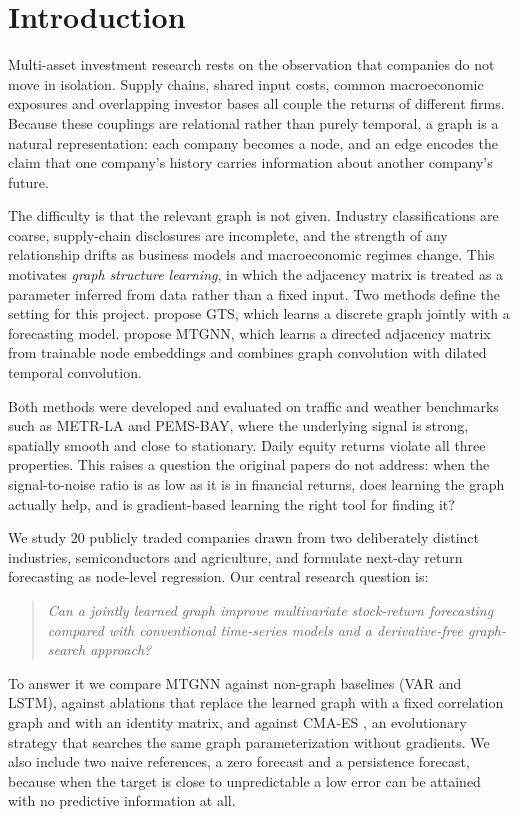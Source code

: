 \section{Introduction}

Multi-asset investment research rests on the observation that companies do not move in isolation. Supply chains, shared input costs, common macroeconomic exposures and overlapping investor bases all couple the returns of different firms. Because these couplings are relational rather than purely temporal, a graph is a natural representation: each company becomes a node, and an edge encodes the claim that one company's history carries information about another company's future.

The difficulty is that the relevant graph is not given. Industry classifications are coarse, supply-chain disclosures are incomplete, and the strength of any relationship drifts as business models and macroeconomic regimes change. This motivates \emph{graph structure learning}, in which the adjacency matrix is treated as a parameter inferred from data rather than a fixed input. Two methods define the setting for this project. \textcite{shang2021gts} propose GTS, which learns a discrete graph jointly with a forecasting model. \textcite{wu2020mtgnn} propose MTGNN, which learns a directed adjacency matrix from trainable node embeddings and combines graph convolution with dilated temporal convolution.

Both methods were developed and evaluated on traffic and weather benchmarks such as METR-LA and PEMS-BAY, where the underlying signal is strong, spatially smooth and close to stationary. Daily equity returns violate all three properties. This raises a question the original papers do not address: when the signal-to-noise ratio is as low as it is in financial returns, does learning the graph actually help, and is gradient-based learning the right tool for finding it?

We study 20 publicly traded companies drawn from two deliberately distinct industries, semiconductors and agriculture, and formulate next-day return forecasting as node-level regression. Our central research question is:

\begin{quote}
\emph{Can a jointly learned graph improve multivariate stock-return forecasting compared with conventional time-series models and a derivative-free graph-search approach?}
\end{quote}

To answer it we compare MTGNN against non-graph baselines (VAR and LSTM), against ablations that replace the learned graph with a fixed correlation graph and with an identity matrix, and against CMA-ES \parencite{hansen2001cmaes}, an evolutionary strategy that searches the same graph parameterization without gradients. We also include two naive references, a zero forecast and a persistence forecast, because when the target is close to unpredictable a low error can be attained with no predictive information at all.

